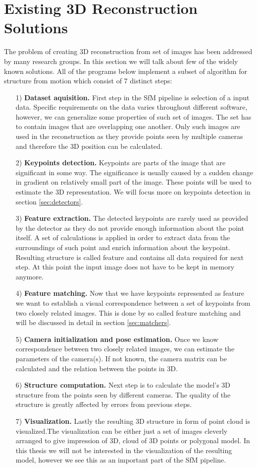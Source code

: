 \section{Existing 3D Reconstruction Solutions}
The problem of creating 3D reconstruction from set of images has been addressed by many research groups. In this section we will talk about few of the widely known solutions. All of the programs below implement a subset of algorithm for structure from motion which consist of 7 distinct steps:
\begin{itemize}
	\item[1)] \textbf{Dataset aquisition.} First step in the SfM pipeline is selection of a input data. Specific requirements on the data varies throughout different software, however, we can generalize some properties of such set of images. The set has to contain images that are overlapping one another. Only such images are used in the reconstruction as they provide points seen by multiple cameras and therefore the 3D position can be calculated.
	\item[2)] \textbf{Keypoints detection.} Keypoints are parts of the image that are significant in some way. The significance is usually caused by a sudden change in gradient on relatively small part of the image. These points will be used to estimate the 3D representation. We will focus more on keypoints detection in section \ref{sec:detectors}. 
	\item[3)] \textbf{Feature extraction.} The detected keypoints are rarely used as provided by the detector as they do not provide enough information about the point itself. A set of calculations is applied in order to extract data from the surroundings of such point and enrich information about the keypoint. Resulting structure is called feature and contains all data required for next step. At this point the input image does not have to be kept in memory anymore.
	\item[4)] \textbf{Feature matching.} Now that we have keypoints represented as feature we want to establish a visual correspondence between a set of keypoints from two closely related images. This is done by so called feature matching and will be discussed in detail in section \ref{sec:matchers}.
	\item[5)] \textbf{Camera initialization and pose estimation.} Once we know correspondence between two closely related images, we can estimate the parameters of the camera(s). If not known, the camera matrix can be calculated and the relation between the points in 3D.
	\item[6)] \textbf{Structure computation.} Next step is to calculate the model's 3D structure from the points seen by different cameras. The quality of the structure is greatly affected by errors from previous steps.
	\item[7)] \textbf{Visualization.} Lastly the resulting 3D structure in form of point cloud is visualized.The visualization can be either just a set of images cleverly arranged to give impression of 3D, cloud of 3D points or polygonal model. In this thesis we will not be interested in the visualization of the resulting model, however we see this as an important part of the SfM pipeline.
\end{itemize}

